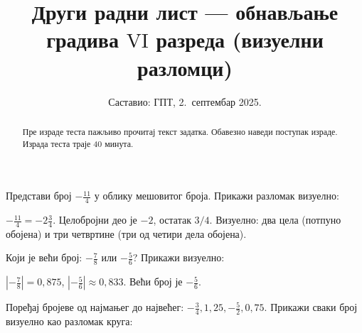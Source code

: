 \documentclass[11pt,a5paper,addpoints]{exam}
\title{Други радни лист — обнављање градива $\mathrm{VI}$ разреда (визуелни разломци)}
\author{Саставио: ГПТ, 2.\ септембар 2025.}
\date{}
\begin{document}
\maketitle
\thispagestyle{headandfoot}

\begin{abstract}
Пре израде теста пажљиво прочитај текст задатка.
Обавезно наведи поступак израде.
Израда теста траје 40 минута.
\end{abstract}

\noindent \gradetable[h]

\begin{questions}

\question[2]
Представи број $-\frac{11}{4}$ у облику мешовитог броја. Прикажи разломак визуелно:

\begin{center}
\end{center}

\begin{solution}[\stretch 2]
$-\frac{11}{4} = -2\frac{3}{4}$.  
Целобројни део је $-2$, остатак $3/4$.  
Визуелно: два цела (потпуно обојена) и три четвртине (три од четири дела обојена).
\end{solution}

\question[3]
Који је већи број: $-\frac{7}{8}$ или $-\frac{5}{6}$? Прикажи визуелно:

\begin{center}
\end{center}

\begin{solution}[\stretch 2]
$|-\frac{7}{8}| = 0,875$, $|-\frac{5}{6}| \approx 0,833$.  
Већи број је $-\frac{5}{6}$.
\end{solution}

\ifprintanswers\else\newpage\fi

\question[3]
Поређај бројеве од најмањег до највећег: $-\frac{3}{4}, 1,25, -\frac{5}{2}, 0,75$.  
Прикажи сваки број визуелно као разломак круга:


\end{questions}
\end{document}
